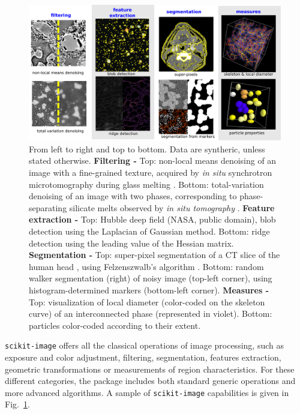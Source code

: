 \documentclass[twocolumn]{bmcart}%
\begin{document}
\begin{figure}
    \centerline{\includegraphics[width=0.99\textwidth]{tomo_gallery}}
    \caption{ From left to right and top to bottom.
	Data are syntheric, unless stated otherwise.
	\textbf{Filtering -} Top: non-local means denoising of an image
	with a fine-grained texture, acquired by \emph{in situ}
	synchrotron microtomography during
	glass melting \citep{Gouillart2012}. Bottom: total-variation
	denoising of an image with two phases, corresponding to
	phase-separating silicate melts observed by \emph{in situ
	tomography} \citep{Bouttes2015}.
	\textbf{Feature extraction -} Top: Hubble deep field (NASA,
	public domain), blob detection using the
	Laplacian of Gaussian method. Bottom: ridge detection using the
	leading value of the Hessian matrix. 
	\textbf{Segmentation - } Top: super-pixel segmentation
	of a CT slice of the human head \citep{tomo_wikipedia}, using
	Felzenszwalb's algorithm \citep{Felzenszwalb2004}. Bottom: random
	walker segmentation (right) of noisy image (top-left corner), using
	histogram-determined markers (bottom-left corner).
	\textbf{Measures -} Top: visualization of local diameter
	(color-coded on the skeleton curve) of an
	interconnected phase (represented in violet).  Bottom: particles color-coded according
	to their extent.
\label{fig:tomo_gallery}}
\end{figure}

\texttt{scikit-image} offers all the classical operations of image
processing, such as exposure and color adjustment, filtering,
segmentation, features extraction, geometric transformations or
measurements of region characteristics. For these
different categories, the package includes both standard generic
operations and more advanced algorithms. A sample of
\texttt{scikit-image} capabilities is given in
Fig.~\ref{fig:tomo_gallery}.  
\end{document}
